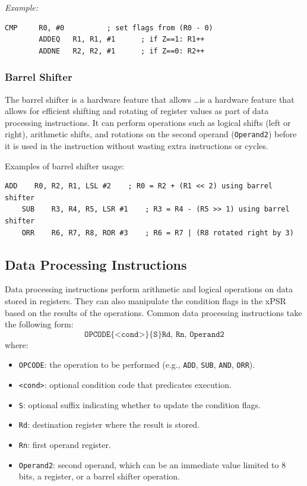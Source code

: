 \noindent\textit{Example:}
\begin{lstlisting}[caption={Using conditional-suffix mnemonics},label={lst:cond-exec}]
        CMP     R0, #0          ; set flags from (R0 - 0)
        ADDEQ   R1, R1, #1      ; if Z==1: R1++
        ADDNE   R2, R2, #1      ; if Z==0: R2++
\end{lstlisting}

\subsubsection{Barrel Shifter}
    
The barrel shifter is a hardware feature that allows …is a hardware feature that allows for efficient shifting and rotating of register values as part of data processing instructions. It can perform operations such as logical shifts (left or right), arithmetic shifts, and rotations on the second operand (\texttt{Operand2}) before it is used in the instruction without wasting extra instructions or cycles.

\noindent Examples of barrel shifter usage:
\begin{lstlisting}[caption={Barrel shifter examples}]
    ADD    R0, R2, R1, LSL #2    ; R0 = R2 + (R1 << 2) using barrel shifter
    SUB    R3, R4, R5, LSR #1    ; R3 = R4 - (R5 >> 1) using barrel shifter
    ORR    R6, R7, R8, ROR #3    ; R6 = R7 | (R8 rotated right by 3)
\end{lstlisting}

\subsection{Data Processing Instructions}
Data processing instructions perform arithmetic and logical operations on data stored in registers. They can also manipulate the condition flags in the xPSR based on the results of the operations. Common data processing instructions take the following form:
\[
\texttt{OPCODE\{<cond>\}\{S\} Rd, Rn, Operand2}
\]
where:
\begin{itemize}[nosep]
  \item \texttt{OPCODE}: the operation to be performed (e.g., \texttt{ADD}, \texttt{SUB}, \texttt{AND}, \texttt{ORR}).
  \item \texttt{<cond>}: optional condition code that predicates execution.
  \item \texttt{S}: optional suffix indicating whether to update the condition flags.
  \item \texttt{Rd}: destination register where the result is stored.
  \item \texttt{Rn}: first operand register.
  \item \texttt{Operand2}: second operand, which can be an immediate value limited to 8 bits, a register, or a barrel shifter operation.
\end{itemize}


